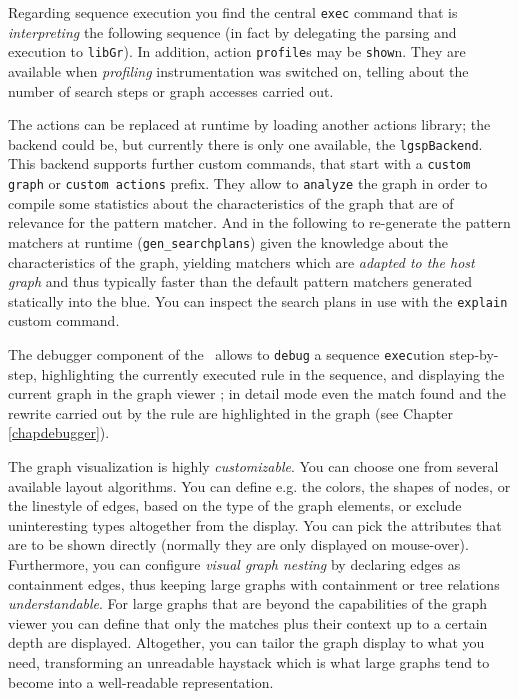 Regarding sequence execution you find the central \texttt{exec} command that is \emph{interpreting} the following sequence (in fact by delegating the parsing and execution to \texttt{libGr}).
In addition, action \texttt{profile}s may be \texttt{show}n. They are available when \emph{profiling} instrumentation was switched on, telling about the number of search steps or graph accesses carried out.

The actions can be replaced at runtime by loading another actions library; the backend could be, but currently there is only one available, the \texttt{lgspBackend}.
This backend supports further custom commands, that start with a \texttt{custom graph} or \texttt{custom actions} prefix. 
They allow to \texttt{analyze} the graph in order to compile some statistics about the characteristics of the graph that are of relevance for the pattern matcher.
And in the following to re-generate the pattern matchers at runtime (\texttt{gen\_searchplans}) given the knowledge about the characteristics of the graph, yielding matchers which are \emph{adapted to the host graph} and thus typically faster than the default pattern matchers generated statically into the blue.
You can inspect the search plans in use with the \texttt{explain} custom command.

The debugger component of the \GrShell\ allows to \texttt{debug} a sequence \texttt{exec}ution step-by-step, highlighting the currently executed rule in the sequence, and displaying the current graph in the graph viewer \yComp;
in detail mode even the match found and the rewrite carried out by the rule are highlighted in the graph (see Chapter \ref{chapdebugger}).

The graph visualization is highly \emph{customizable}.
You can choose one from several available layout algorithms.
You can define e.g. the colors, the shapes of nodes, or the linestyle of edges, based on the type of the graph elements,
or exclude uninteresting types altogether from the display.
You can pick the attributes that are to be shown directly (normally they are only displayed on mouse-over).
Furthermore, you can configure \emph{visual graph nesting} by declaring edges as containment edges, thus keeping large graphs with containment or tree relations \emph{understandable}.
For large graphs that are beyond the capabilities of the graph viewer you can define that only the matches plus their context up to a certain depth are displayed.
Altogether, you can tailor the graph display to what you need, transforming an unreadable haystack which is what large graphs tend to become into a well-readable representation.

